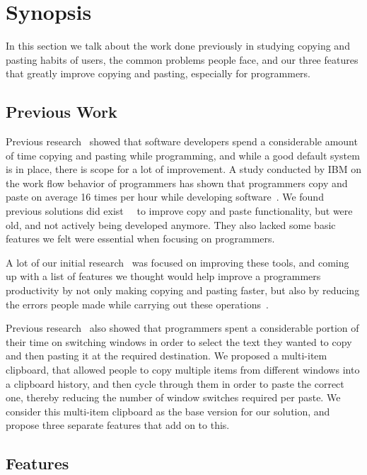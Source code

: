 \documentclass{acm_proc_article-sp}
\begin{document}
\section{Synopsis}\label{sec:synopsis}

In this section we talk about the work done previously in studying copying and pasting habits of users, the common problems people face, and our three features that greatly improve copying and pasting, especially for programmers.

\subsection{Previous Work}\label{sec:previous}

Previous research~\cite{devWorkHabits} showed that software developers spend a considerable amount of time copying and pasting while programming, and while a good default system is in place, there is scope for a lot of improvement. A study conducted by IBM on the work flow behavior of programmers has shown that programmers copy and paste on average 16 times per hour while developing software~\cite{ooplCP}. We found previous solutions did exist~\cite{overlapWindow}~\cite{cpHabits} to improve copy and paste functionality, but were old, and not actively being developed anymore. They also lacked some basic features we felt were essential when focusing on programmers. 

A lot of our initial research~\cite{janReport} was focused on improving these tools, and coming up with a list of features we thought would help improve a programmers productivity by not only making copying and pasting faster, but also by reducing the errors people made while carrying out these operations~\cite{maintenenceStudy}.

Previous research~\cite{cpHabits} also showed that programmers spent a considerable portion of their time on switching windows in order to select the text they wanted to copy and then pasting it at the required destination. We proposed a multi-item clipboard, that allowed people to copy multiple items from different windows into a clipboard history, and then cycle through them in order to paste the correct one, thereby reducing the number of window switches required per paste. We consider this multi-item clipboard as the base version for our solution, and propose three separate features that add on to this.

\subsection{Features}\label{sec:features}
\end{document}

